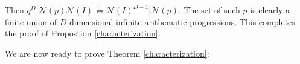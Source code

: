 \documentclass[11pt]{amsart}
\theoremstyle{definition}
\DeclareMathOperator*{\E}{\mathbb{E}}
\newcommand{\C}{{\mathbb C}}
\newcommand{\D}{{\mathbb D}}
\newcommand{\NN}{{\mathcal N}}
\newcommand{\R}{{\mathbb R}}
\begin{document}
Then $q^{D}\vert\NN(p)\NN(I)\Leftrightarrow \NN(I)^{D-1}\vert\NN(p)$. The set of such $p$ is clearly a finite union of $D$-dimensional infinite arithematic progressions. This completes the proof of  Propostion \ref{characterization}. 
 

\fi





 
 
 


We are now ready to prove Theorem \ref{characterization}:

 
\end{document}
